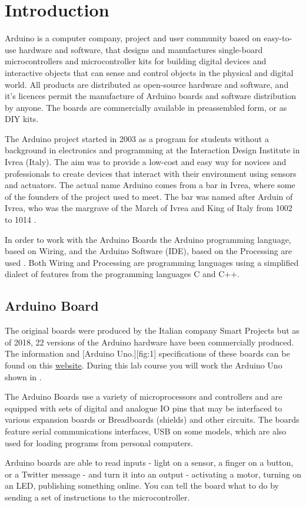 \section{Introduction}
Arduino is a computer company, project and user community based on easy-to-use hardware and software, that designs and manufactures single-board microcontrollers and microcontroller kits for building digital devices and interactive objects that can sense and control objects in the physical and digital world. All products are distributed as open-source hardware and software, and it's licences permit the manufacture of Arduino boards and software distribution by anyone. The boards are commercially available in preassembled form, or as \ac{DIY} kits.\par
%
The Arduino project started in 2003 as a program for students without a background in electronics and programming at the Interaction Design Institute in Ivrea (Italy). The aim was to provide a low-cost and easy way for novices and professionals to create devices that interact with their environment using sensors and actuators. The actual name Arduino comes from a bar in Ivrea, where some of the founders of the project used to meet. The bar was named after Arduin of Ivrea, who was the margrave of the March of Ivrea and King of Italy from 1002 to 1014 \cite{wiki:1}. \par
%
In order to work with the Arduino Boards the Arduino programming language, based on Wiring, and the Arduino Software (\ac{IDE}), based on the Processing are used \cite{arduino:1}. Both Wiring and Processing are programming languages using a simplified dialect of features from the programming languages C and C++.
%
\subsection{Arduino Board}
The original boards were produced by the Italian company Smart Projects but as of 2018, 22 versions of the Arduino hardware have been commercially produced. The information and 
[Arduino Uno.][fig:1]
specifications of these boards can be found on this {\href{https://www.arduino.cc/en/Products/Compare}{website}}. During this lab course you will work the Arduino Uno shown in . \par 
%
The Arduino Boards use a variety of microprocessors and controllers and are equipped with sets of digital and analogue \ac{IO} pins that may be interfaced to various expansion boards or Breadboards (shields) and other circuits. The boards feature serial communications interfaces, \ac{USB} on some models, which are also used for loading programs from personal computers.\par
%
Arduino boards are able to read inputs - light on a sensor, a finger on a button, or a Twitter message - and turn it into an output - activating a motor, turning on an LED, publishing something online. You can tell the board what to do by sending a set of instructions to the microcontroller.
%
